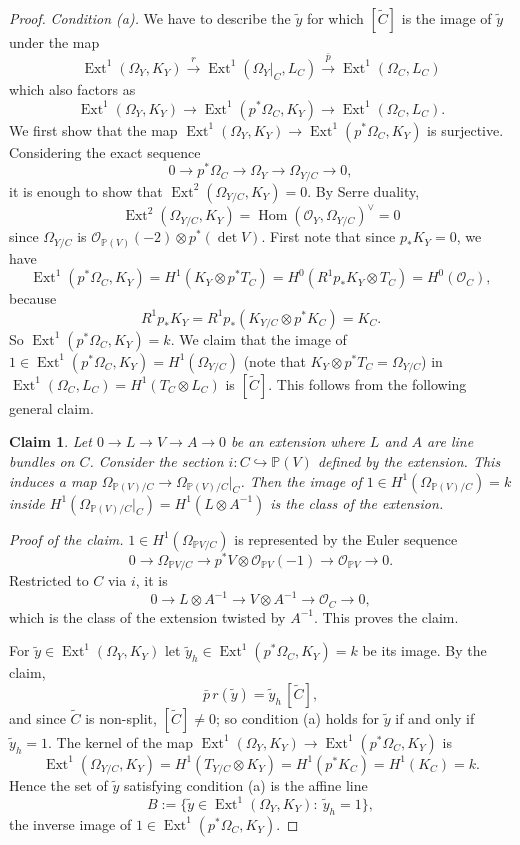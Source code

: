 \documentclass[11pt,reqno]{amsart}
\theoremstyle{plain}
\newtheorem{claim}[theorem]{Claim}
\theoremstyle{definition}
\newcommand{\PP}{\mathbb{P}}
\newcommand{\OO}{\mathcal{O}}
\newcommand{\Hom}{\operatorname{Hom}}
\newcommand{\Ext}{\operatorname{Ext}}
\newcommand{\Ct}{\widetilde{C}}
\newcommand{\yt}{\tilde{y}}
\begin{document}
\begin{proof}
\emph{Condition (a).} We have to describe the $\yt$ for which $[\Ct]$ is the image of $\yt$ under the map
\[
\Ext^1(\Omega_Y,K_Y)\xrightarrow{\ r\ }\Ext^1(\Omega_Y|_C,L_C)\xrightarrow{\ \bar p\ }\Ext^1(\Omega_C,L_C)
\]
which also factors as
\[
\Ext^1(\Omega_Y,K_Y)\to\Ext^1(p^*\Omega_C,K_Y)\to\Ext^1(\Omega_C,L_C).
\]
We first show that the map $\Ext^1(\Omega_Y,K_Y)\to\Ext^1(p^*\Omega_C,K_Y)$ is surjective. Considering the exact sequence
\[
0\to p^*\Omega_C\to\Omega_Y\to\Omega_{Y/C}\to0 ,
\]
it is enough to show that $\Ext^2(\Omega_{Y/C},K_Y)=0$. By Serre duality,
\[
\Ext^2(\Omega_{Y/C},K_Y)=\Hom(\OO_Y,\Omega_{Y/C})^{\vee}=0
\]
since $\Omega_{Y/C}$ is $\OO_{\PP(V)}(-2)\otimes p^*(\det V)$. First note that since $p_*K_Y=0$, we have
\[
\Ext^1(p^*\Omega_C,K_Y)=H^1(K_Y\otimes p^*T_C)=H^0(R^1p_*K_Y\otimes T_C)=H^0(\OO_C),
\]
because
\[
R^1p_*K_Y=R^1p_*(K_{Y/C}\otimes p^*K_C)=K_C .
\]
So $\Ext^1(p^*\Omega_C,K_Y)=k$. We claim that the image of $1\in\Ext^1(p^*\Omega_C,K_Y)=H^1(\Omega_{Y/C})$ (note that $K_Y\otimes p^*T_C=\Omega_{Y/C}$) in $\Ext^1(\Omega_C,L_C)=H^1(T_C\otimes L_C)$ is $[\Ct]$. This follows from the following general claim.

\begin{claim}\label{claim:euler}
Let $0\to L\to V\to A\to0$ be an extension where $L$ and $A$ are line bundles on $C$. Consider the section $i\colon C\hookrightarrow\PP(V)$ defined by the extension. This induces a map $\Omega_{\PP(V)/C}\to\Omega_{\PP(V)/C}|_C$. Then the image of $1\in H^1(\Omega_{\PP(V)/C})=k$ inside $H^1(\Omega_{\PP(V)/C}|_C)=H^1(L\otimes A^{-1})$ is the class of the extension.
\end{claim}

\emph{Proof of the claim.} $1\in H^1(\Omega_{\PP V/C})$ is represented by the Euler sequence
\[
0\to\Omega_{\PP V/C}\to p^*V\otimes\OO_{\PP V}(-1)\to\OO_{\PP V}\to0 .
\]
Restricted to $C$ via $i$, it is
\[
0\to L\otimes A^{-1}\to V\otimes A^{-1}\to\OO_C\to0 ,
\]
which is the class of the extension twisted by $A^{-1}$. This proves the claim.

For $\yt\in\Ext^1(\Omega_Y,K_Y)$ let $\yt_h\in\Ext^1(p^*\Omega_C,K_Y)=k$ be its image. By the claim,
\begin{equation}\label{eq:pbar-r}
\bar p\,r(\yt)=\yt_h\,[\Ct] ,
\end{equation}
and since $\Ct$ is non-split, $[\Ct]\ne0$; so condition (a) holds for $\yt$ if and only if $\yt_h=1$. The kernel of the map $\Ext^1(\Omega_Y,K_Y)\to\Ext^1(p^*\Omega_C,K_Y)$ is
\[
\Ext^1(\Omega_{Y/C},K_Y)=H^1(T_{Y/C}\otimes K_Y)=H^1(p^*K_C)=H^1(K_C)=k .
\]
Hence the set of $\yt$ satisfying condition (a) is the affine line
\[
B:=\{\yt\in\Ext^1(\Omega_Y,K_Y):\ \yt_h=1\},
\]
the inverse image of $1\in\Ext^1(p^*\Omega_C,K_Y)$.


\end{proof}
\end{document}
